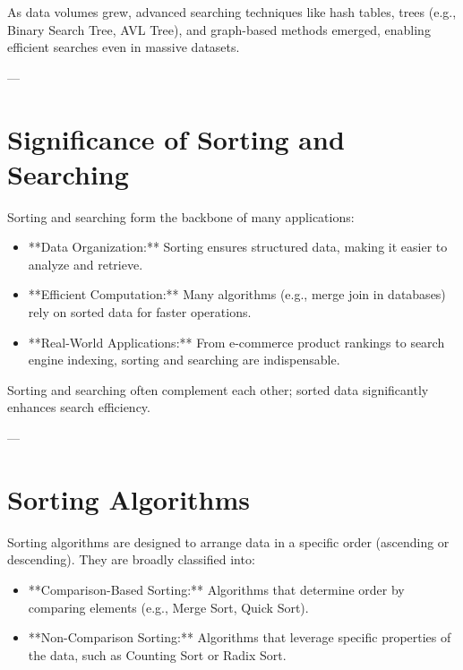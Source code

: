 As data volumes grew, advanced searching techniques like hash tables, trees (e.g., Binary Search Tree, AVL Tree), and graph-based methods emerged, enabling efficient searches even in massive datasets.

---

\section*{Significance of Sorting and Searching}

Sorting and searching form the backbone of many applications:
\begin{itemize}
    \item **Data Organization:** Sorting ensures structured data, making it easier to analyze and retrieve.
    \item **Efficient Computation:** Many algorithms (e.g., merge join in databases) rely on sorted data for faster operations.
    \item **Real-World Applications:** From e-commerce product rankings to search engine indexing, sorting and searching are indispensable.
\end{itemize}

Sorting and searching often complement each other; sorted data significantly enhances search efficiency.

---

\section*{Sorting Algorithms}

Sorting algorithms are designed to arrange data in a specific order (ascending or descending). They are broadly classified into:
\begin{itemize}
    \item **Comparison-Based Sorting:** Algorithms that determine order by comparing elements (e.g., Merge Sort, Quick Sort).
    \item **Non-Comparison Sorting:** Algorithms that leverage specific properties of the data, such as Counting Sort or Radix Sort.
\end{itemize}

